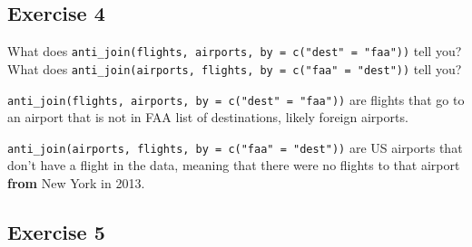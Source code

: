 \documentclass[]{book}
\newenvironment{Shaded}{\begin{snugshade}}{\end{snugshade}}
\newcommand{\CommentTok}[1]{\textcolor[rgb]{0.56,0.35,0.01}{\textit{#1}}}
\newcommand{\DataTypeTok}[1]{\textcolor[rgb]{0.13,0.29,0.53}{#1}}
\newcommand{\DecValTok}[1]{\textcolor[rgb]{0.00,0.00,0.81}{#1}}
\newcommand{\KeywordTok}[1]{\textcolor[rgb]{0.13,0.29,0.53}{\textbf{#1}}}
\newcommand{\NormalTok}[1]{#1}
\newcommand{\OperatorTok}[1]{\textcolor[rgb]{0.81,0.36,0.00}{\textbf{#1}}}
\newcommand{\OtherTok}[1]{\textcolor[rgb]{0.56,0.35,0.01}{#1}}
\newcommand{\StringTok}[1]{\textcolor[rgb]{0.31,0.60,0.02}{#1}}
\theoremstyle{plain}
\theoremstyle{remark}
\theoremstyle{definition}
\theoremstyle{definition}
\theoremstyle{definition}
\theoremstyle{remark}
\begin{document}
\begin{Shaded}
\end{Shaded}

\hypertarget{exercise-4-19}{%
\subsection{Exercise 4}\label{exercise-4-19}}

What does
\texttt{anti\_join(flights,\ airports,\ by\ =\ c("dest"\ =\ "faa"))}
tell you? What does
\texttt{anti\_join(airports,\ flights,\ by\ =\ c("faa"\ =\ "dest"))}
tell you?

\texttt{anti\_join(flights,\ airports,\ by\ =\ c("dest"\ =\ "faa"))} are
flights that go to an airport that is not in FAA list of destinations,
likely foreign airports.

\texttt{anti\_join(airports,\ flights,\ by\ =\ c("faa"\ =\ "dest"))} are
US airports that don't have a flight in the data, meaning that there
were no flights to that airport \textbf{from} New York in 2013.

\hypertarget{exercise-5-11}{%
\subsection{Exercise 5}\label{exercise-5-11}}
\end{document}
